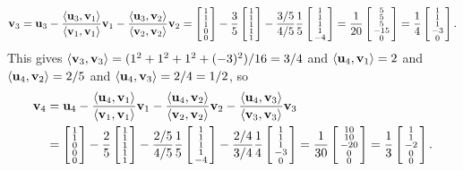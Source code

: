  \[ \vv_3 = \vu_3 - \frac{\ip{\vu_3,\vv_1}}{\ip{\vv_1,\vv_1}}\vv_1
              - \frac{\ip{\vu_3,\vv_2}}{\ip{\vv_2,\vv_2}}\vv_2
    = \bsm 1\\ 1\\ 1\\ 0\\ 0\esm
      - \frac{3}{5} \bsm 1\\1\\1\\1\\1 \esm
      - \frac{3/5}{4/5} \frac{1}{5} \bsm 1\\1\\1\\1\\-4 \esm
    = \frac{1}{20} \bsm 5\\ 5\\ 5\\ -15\\ 0\esm
    = \frac{1}{4} \bsm 1\\ 1\\ 1\\ -3\\ 0\esm .
 \]
 This gives $\ip{\vv_3,\vv_3}=(1^2+1^2+1^2+(-3)^2)/16=3/4$ and
 $\ip{\vu_4,\vv_1}=2$ and $\ip{\vu_4,\vv_2}=2/5$ and
 $\ip{\vu_4,\vv_3}=2/4=1/2$, so
 \begin{align*}
  \vv_4 &=  \vu_4 - \frac{\ip{\vu_4,\vv_1}}{\ip{\vv_1,\vv_1}}\vv_1
              - \frac{\ip{\vu_4,\vv_2}}{\ip{\vv_2,\vv_2}}\vv_2
              - \frac{\ip{\vu_4,\vv_3}}{\ip{\vv_3,\vv_3}}\vv_3 \\
   &= \bsm 1\\ 1\\ 0\\ 0\\ 0\esm
      - \frac{2}{5} \bsm 1\\1\\1\\1\\1 \esm
      - \frac{2/5}{4/5} \frac{1}{5} \bsm 1\\1\\1\\1\\-4 \esm
      - \frac{2/4}{3/4} \frac{1}{4} \bsm 1\\1\\1\\-3\\0 \esm
    = \frac{1}{30} \bsm 10\\ 10\\ -20\\ 0\\ 0\esm
    = \frac{1}{3} \bsm 1\\ 1\\ -2\\ 0\\ 0\esm .
 \end{align*}
